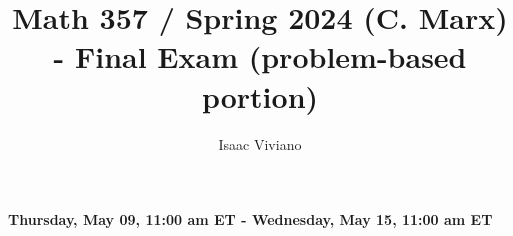 \documentclass[12pt, reqno]{article}
\theoremstyle{definition}
\theoremstyle{remark}
\begin{document}
\title{Math 357 / Spring 2024 (C. Marx)  -  Final Exam ({\bf{problem-based portion}})}
\date{}
\author{Isaac Viviano}  %

\maketitle

\vspace{- 0.5 cm}
\begin{center} {\bf{Thursday, May 09, 11:00 am ET - Wednesday, May 15, 11:00 am ET }} \end{center}







\end{document}

